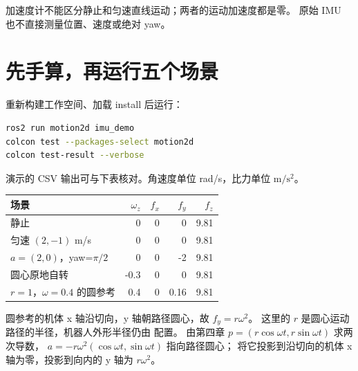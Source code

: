 \begin{center}
\end{center}

\begin{notebox}
加速度计不能区分静止和匀速直线运动；两者的运动加速度都是零。
原始 IMU 也不直接测量位置、速度或绝对 yaw。
\end{notebox}

\section{先手算，再运行五个场景}
重新构建工作空间、加载 install 后运行：
\begin{lstlisting}[language=bash,numbers=none]
ros2 run motion2d imu_demo
colcon test --packages-select motion2d
colcon test-result --verbose
\end{lstlisting}
演示的 CSV 输出可与下表核对。角速度单位 rad/s，比力单位 $\mathrm{m/s^2}$。
\begin{center}
\begin{tabular}{lrrrr}
\toprule
场景 & $\omega_z$ & $f_x$ & $f_y$ & $f_z$\\
\midrule
静止 & 0 & 0 & 0 & 9.81\\
匀速 $(2,-1)$ m/s & 0 & 0 & 0 & 9.81\\
$a=(2,0)$，yaw=$\pi/2$ & 0 & 0 & -2 & 9.81\\
圆心原地自转 & -0.3 & 0 & 0 & 9.81\\
$r=1$，$\omega=0.4$ 的圆参考 & 0.4 & 0 & 0.16 & 9.81\\
\bottomrule
\end{tabular}
\end{center}
圆参考的机体 x 轴沿切向，y 轴朝路径圆心，故 $f_y=r\omega^2$。
这里的 $r$ 是圆心运动路径的半径，机器人外形半径仍由  配置。
由第四章 $p=(r\cos\omega t,r\sin\omega t)$ 求两次导数，
$a=-r\omega^2(\cos\omega t,\sin\omega t)$ 指向路径圆心；
将它投影到沿切向的机体 x 轴为零，投影到向内的 y 轴为 $r\omega^2$。

